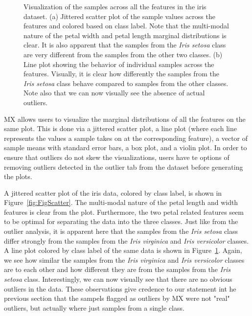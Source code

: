 \documentclass[12pt]{article}
\begin{document}
\begin{figure}[t!]
\begin{subfigure}[t]{0.48\textwidth}
		\subcaption{}
		\label{fig:FigLine}
	\end{subfigure}
	\vspace{-1.5\baselineskip}
	\caption{Visualization of the samples across all the features in the iris dataset. (a) Jittered scatter plot of the sample values across the features and colored based on class label. Note that the multi-modal nature of the petal width and petal length marginal distributions is clear. It is also apparent that the samples from the \textit{Iris setosa} class are very different from the samples from the other two classes. (b) Line plot showing the behavior of individual samples across the features. Visually, it is clear how differently the samples from the \textit{Iris setosa} class behave compared to samples from the other classes. Note also that we can now visually see the absence of actual outliers.}
	\label{fig:FigFeature}
\end{figure}

MX allows users to visualize the marginal distributions of all the features on the same plot. This is done via a jittered scatter plot, a line plot (where each line represents the values a sample takes on at the corresponding feature), a vector of sample means with standard error bars, a box plot, and a violin plot. In order to ensure that outliers do not skew the visualizations, users have te options of removing outliers detected in the outlier tab from the dataset before generating the plots. 

A jittered scatter plot of the iris data, colored by class label, is shown in Figure~\ref{fig:FigScatter}. The multi-modal nature of the petal length and width features is clear from the plot. Furthermore, the two petal related features seem to be optimal for separating the data into the three classes. Just like from the outlier analysis, it is apparent here that the samples from the \textit{Iris setosa} class differ strongly from the samples from the \textit{Iris virginica} and \textit{Iris versicolor} classes. A line plot colored by class label of the same data is shown in Figure~\ref{fig:FigLine}. Again, we see how similar the samples from the \textit{Iris virginica} and \textit{Iris versicolor} classes are to each other and how different they are from the samples from the \textit{Iris setosa} class. Interestingly, we can now visually see that there are no obvious outliers in the data. These observations give credence to our statement int he previous section that the sampels flagged as outliers by MX were not "real" outliers, but actually where just samples from a single class.
\end{document}
